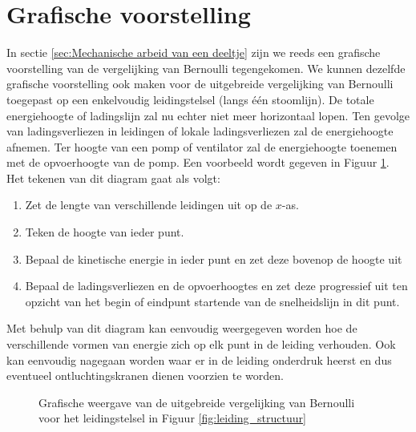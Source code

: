 		\section{Grafische voorstelling}
In sectie \ref{sec:Mechanische arbeid van een deeltje} zijn we reeds een grafische voorstelling van de vergelijking van Bernoulli tegengekomen. We kunnen dezelfde grafische voorstelling ook maken voor de uitgebreide vergelijking van Bernoulli toegepast op een enkelvoudig leidingstelsel (langs één stoomlijn). De totale energiehoogte of ladingslijn zal nu echter niet meer horizontaal lopen. Ten gevolge van ladingsverliezen in leidingen of lokale ladingsverliezen zal de energiehoogte afnemen. Ter hoogte van een pomp of ventilator zal de energiehoogte toenemen met de opvoerhoogte van de pomp. Een voorbeeld wordt gegeven in Figuur \ref{fig:leidingstelsel_energiehoogte}. Het tekenen van dit diagram gaat als volgt:
\begin{enumerate}
	\item Zet de lengte van verschillende leidingen uit op de $x$-as.
	\item Teken de hoogte van ieder punt.
	\item Bepaal de kinetische energie in ieder punt en zet deze bovenop de hoogte uit
	\item Bepaal de ladingsverliezen en de opvoerhoogtes en zet deze progressief uit ten opzicht van het begin of eindpunt startende van de snelheidslijn in dit punt.
\end{enumerate}
Met behulp van dit diagram kan eenvoudig weergegeven worden hoe de verschillende vormen van energie zich op elk punt in de leiding verhouden. Ook kan eenvoudig nagegaan worden waar er in de leiding onderdruk heerst en dus eventueel ontluchtingskranen dienen voorzien te worden.
\begin{figure}
	\centering
	
	\caption{Grafische weergave van de uitgebreide vergelijking van Bernoulli voor het leidingstelsel in Figuur \ref{fig:leiding_structuur}}
	\label{fig:leidingstelsel_energiehoogte}
\end{figure}


